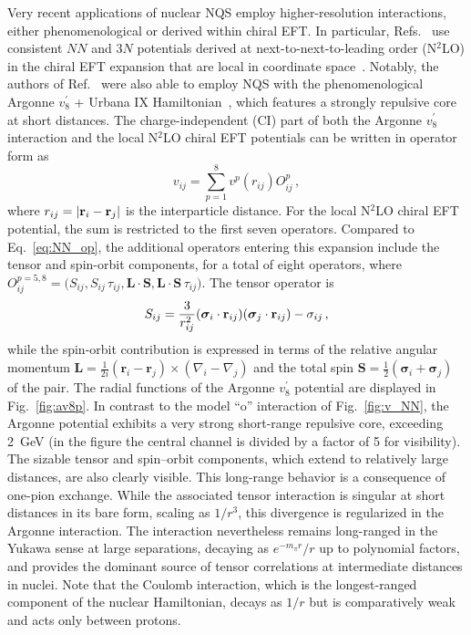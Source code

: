 Very recent applications of nuclear NQS employ higher-resolution interactions, either phenomenological or derived within chiral EFT. In particular, Refs.~\cite{yang_chiral_2025,wen_neural-network_2025,yang_zemach_2025} use consistent $NN$ and $3N$ potentials derived at next-to-next-to-leading order (N$^2$LO) in the chiral EFT expansion that are local in coordinate space~\cite{gezerlis_quantum_2013,gezerlis_local_2014,lynn_chiral_2016}. Notably, the authors of Ref.~\cite{yang_chiral_2025} were also able to employ NQS with the phenomenological Argonne $v_8^\prime$ + Urbana IX Hamiltonian~\cite{pudliner_quantum_1995}, which features a strongly repulsive core at short distances.
The charge-independent (CI) part of both the Argonne $v_8^\prime$ interaction and the local N$^2$LO chiral EFT potentials can be written in operator form as
\begin{equation}
v_{ij} = \sum_{p=1}^{8} v^p(r_{ij}) O^p_{ij}\,,
\label{eq:vij_op_sum}
\end{equation}
where $r_{ij} = |{\bf r}_i - {\bf r}_j|$ is the interparticle distance.
For the local N$^2$LO chiral EFT potential, the sum is restricted to the first seven operators.
Compared to Eq.~\eqref{eq:NN_op}, the additional operators entering this expansion include the tensor and spin-orbit components, for a total of eight operators, where $O^{p=5,8}_{ij} = \bigl( S_{ij}, S_{ij}\, \tau_{ij}, \mathbf{L} \cdot \mathbf{S}, \mathbf{L} \cdot \mathbf{S}\, \tau_{ij} \bigr)$. 
The tensor operator is
\begin{equation}
S_{ij}= \frac{3}{r^2_{ij}}(\boldsymbol{\sigma}_i\cdot {\bf r}_{ij})(\boldsymbol{\sigma}_j \cdot{\bf r}_{ij})- \sigma_{ij}\, ,
\end{equation}
while the spin-orbit contribution is expressed in terms of the relative angular momentum $\mathbf{L}=\frac{1}{2 i} (\mathbf{r}_i -\mathbf{r}_j) \times (\nabla_i - \nabla_j)$ and the total spin $\mathbf{S}=\frac{1}{2}(\boldsymbol{\sigma}_i+\boldsymbol{\sigma}_j)$ of the pair. The radial functions of the Argonne $v_8^\prime$ potential are displayed in Fig.~\ref{fig:av8p}.  
In contrast to the model ``o'' interaction of Fig.~\ref{fig:v_NN}, the Argonne potential exhibits a very strong short-range repulsive core, exceeding 2~GeV (in the figure the central channel is divided by a factor of 5 for visibility). The sizable tensor and spin--orbit components, which extend to relatively large distances, are also clearly visible. This long-range behavior is a consequence of one-pion exchange. While the associated tensor interaction is singular at short distances in its bare form, scaling as $1/r^3$, this divergence is regularized in the Argonne interaction. The interaction nevertheless remains long-ranged in the Yukawa sense at large separations, decaying as $e^{-m_\pi r}/r$ up to polynomial factors, and provides the dominant source of tensor correlations at intermediate distances in nuclei. Note that the Coulomb interaction, which is the longest-ranged component of the nuclear Hamiltonian, decays as $1/r$ but is comparatively weak and acts only between protons. %

